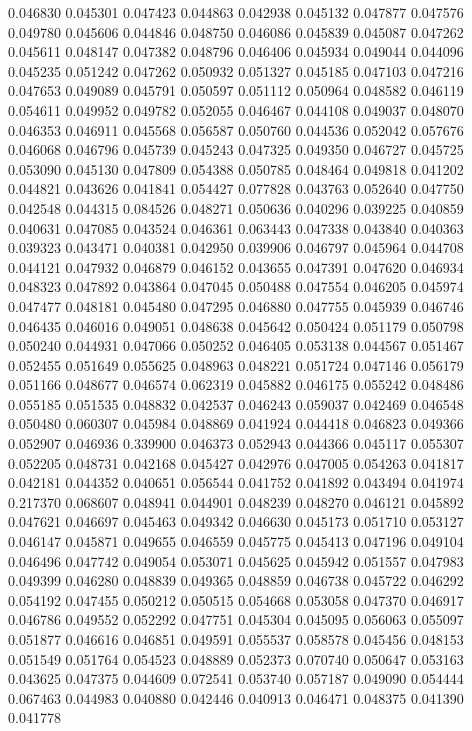 0.046830
0.045301
0.047423
0.044863
0.042938
0.045132
0.047877
0.047576
0.049780
0.045606
0.044846
0.048750
0.046086
0.045839
0.045087
0.047262
0.045611
0.048147
0.047382
0.048796
0.046406
0.045934
0.049044
0.044096
0.045235
0.051242
0.047262
0.050932
0.051327
0.045185
0.047103
0.047216
0.047653
0.049089
0.045791
0.050597
0.051112
0.050964
0.048582
0.046119
0.054611
0.049952
0.049782
0.052055
0.046467
0.044108
0.049037
0.048070
0.046353
0.046911
0.045568
0.056587
0.050760
0.044536
0.052042
0.057676
0.046068
0.046796
0.045739
0.045243
0.047325
0.049350
0.046727
0.045725
0.053090
0.045130
0.047809
0.054388
0.050785
0.048464
0.049818
0.041202
0.044821
0.043626
0.041841
0.054427
0.077828
0.043763
0.052640
0.047750
0.042548
0.044315
0.084526
0.048271
0.050636
0.040296
0.039225
0.040859
0.040631
0.047085
0.043524
0.046361
0.063443
0.047338
0.043840
0.040363
0.039323
0.043471
0.040381
0.042950
0.039906
0.046797
0.045964
0.044708
0.044121
0.047932
0.046879
0.046152
0.043655
0.047391
0.047620
0.046934
0.048323
0.047892
0.043864
0.047045
0.050488
0.047554
0.046205
0.045974
0.047477
0.048181
0.045480
0.047295
0.046880
0.047755
0.045939
0.046746
0.046435
0.046016
0.049051
0.048638
0.045642
0.050424
0.051179
0.050798
0.050240
0.044931
0.047066
0.050252
0.046405
0.053138
0.044567
0.051467
0.052455
0.051649
0.055625
0.048963
0.048221
0.051724
0.047146
0.056179
0.051166
0.048677
0.046574
0.062319
0.045882
0.046175
0.055242
0.048486
0.055185
0.051535
0.048832
0.042537
0.046243
0.059037
0.042469
0.046548
0.050480
0.060307
0.045984
0.048869
0.041924
0.044418
0.046823
0.049366
0.052907
0.046936
0.339900
0.046373
0.052943
0.044366
0.045117
0.055307
0.052205
0.048731
0.042168
0.045427
0.042976
0.047005
0.054263
0.041817
0.042181
0.044352
0.040651
0.056544
0.041752
0.041892
0.043494
0.041974
0.217370
0.068607
0.048941
0.044901
0.048239
0.048270
0.046121
0.045892
0.047621
0.046697
0.045463
0.049342
0.046630
0.045173
0.051710
0.053127
0.046147
0.045871
0.049655
0.046559
0.045775
0.045413
0.047196
0.049104
0.046496
0.047742
0.049054
0.053071
0.045625
0.045942
0.051557
0.047983
0.049399
0.046280
0.048839
0.049365
0.048859
0.046738
0.045722
0.046292
0.054192
0.047455
0.050212
0.050515
0.054668
0.053058
0.047370
0.046917
0.046786
0.049552
0.052292
0.047751
0.045304
0.045095
0.056063
0.055097
0.051877
0.046616
0.046851
0.049591
0.055537
0.058578
0.045456
0.048153
0.051549
0.051764
0.054523
0.048889
0.052373
0.070740
0.050647
0.053163
0.043625
0.047375
0.044609
0.072541
0.053740
0.057187
0.049090
0.054444
0.067463
0.044983
0.040880
0.042446
0.040913
0.046471
0.048375
0.041390
0.041778

